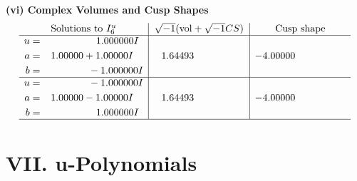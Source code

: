 \documentclass[1p]{elsarticle_modified}
\theoremstyle{definition}
\newcommand{\I}{\sqrt{-1}}
\begin{document}
\newpage\flushleft \textbf{(vi) Complex Volumes and Cusp Shapes}
$$\begin{array}{c|c|c}  
\text{Solutions to }I^u_{6}& \I (\text{vol} + \sqrt{-1}CS) & \text{Cusp shape}\\
 \hline 
\begin{aligned}
u &= \phantom{-0.000000 -}1.000000 I \\
a &= \phantom{-}1.00000 + 1.00000 I \\
b &= \phantom{-0.000000 } -1.000000 I\end{aligned}
 & \phantom{-}1.64493\phantom{ +0.000000I} & -4.00000\phantom{ +0.000000I} \\ \hline\begin{aligned}
u &= \phantom{-0.000000 } -1.000000 I \\
a &= \phantom{-}1.00000 - 1.00000 I \\
b &= \phantom{-0.000000 -}1.000000 I\end{aligned}
 & \phantom{-}1.64493\phantom{ +0.000000I} & -4.00000\phantom{ +0.000000I}\\
 \hline 
 \end{array}$$\newpage
\newpage\renewcommand{\arraystretch}{1}
\centering \section*{ VII. u-Polynomials}
\end{document}
